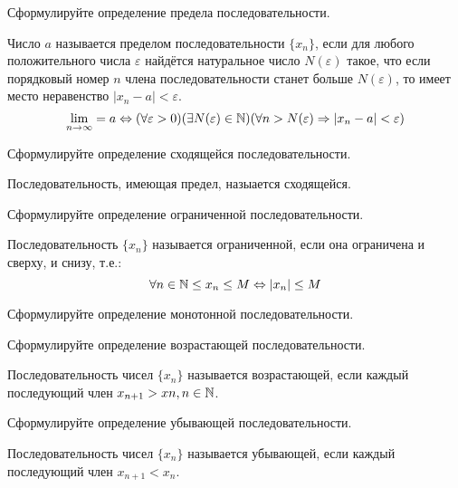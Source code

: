 \begin{question}
  Сформулируйте определение предела последовательности.
\end{question}
\begin{answer}
 Число $a$ называется пределом последовательности $\{x_{n}\}$, если для любого положительного числа $\varepsilon$ найдётся натуральное число $N(\varepsilon)$ такое, что если порядковый номер $n$ члена последовательности станет больше $N(\varepsilon)$, то имеет место неравенство $|x_{n} - a| < \varepsilon$.\[
 \lim_{n \to \infty} = a \iff (\forall \varepsilon > 0)(\exists N(\varepsilon) \in \N)(\forall  n > N(\varepsilon) \implies |x_{n} - a| < \varepsilon) 
 \] 
\end{answer}

\begin{question}
  Сформулируйте определение сходящейся последовательности.
\end{question}
\begin{answer}
  Последовательность, имеющая предел, назыается сходящейся.
\end{answer}

\begin{question}
  Сформулируйте определение ограниченной последовательности.
\end{question}
\begin{answer}
  Последовательность $\{x_{n}\}$ называется ограниченной, если она ограничена и сверху, и снизу, т.е.: \[
  \forall n \in \mathbb{N} \le x_{n} \le M \Leftrightarrow |x_{n}| \le M
  \] 
\end{answer}

\begin{question}
  Сформулируйте определение монотонной последовательности.
\end{question}

\begin{question}
  Сформулируйте определение возрастающей последовательности.
\end{question}
\begin{answer}
  Последовательность чисел $\{x_{n}\}$ называется возрастающей, если каждый последующий член $x_{n+1} > xn, n \in \mathbb{N}$.
\end{answer}

\begin{question}
  Сформулируйте определение убывающей последовательности.
\end{question}
\begin{answer}
  Последовательность чисел $\{x_{n}\}$ называется убывающей, если каждый последующий член $x_{n+1} < x_{n}$.
\end{answer}


